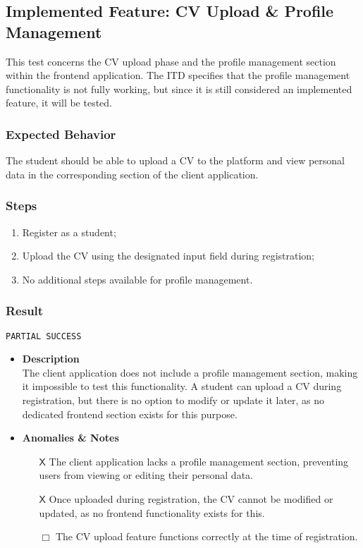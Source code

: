 \begin{itemize}
\begin{itemize}
        \end{itemize}
\end{itemize}
\subsection{Implemented Feature:  CV Upload \& Profile Management}
This test concerns the CV upload phase and the profile management section within the frontend application. The ITD specifies that the profile management functionality is not fully working, but since it is still considered an implemented feature, it will be tested.
\subsubsection{Expected Behavior}
The student should be able to upload a CV to the platform and view personal data in the corresponding section of the client application.
\subsubsection{Steps}
\begin{enumerate}
    \item Register as a student;
    \item Upload the CV using the designated input field during registration;
    \item No additional steps available for profile management.
\end{enumerate}
\subsubsection{Result}
\verb|PARTIAL SUCCESS|
\begin{itemize}
    \item \textbf{\color{titleColor} Description}\\
   The client application does not include a profile management section, making it impossible to test this functionality. A student can upload a CV during registration, but there is no option to modify or update it later, as no dedicated frontend section exists for this purpose. 
    \item \textbf{\color{titleColor} Anomalies \& Notes}
    \begin{itemize}
            \item [{\color{titleColor}\(\mathsf{X}\)}] The client application lacks a profile management section, preventing users from viewing or editing their personal data.
            \item [{\color{titleColor}\(\mathsf{X}\)}] Once uploaded during registration, the CV cannot be modified or updated, as no frontend functionality exists for this.
            \item [{\color{titleColor}\(\Box \)}] The CV upload feature functions correctly at the time of registration.
        \end{itemize} 
\end{itemize}
